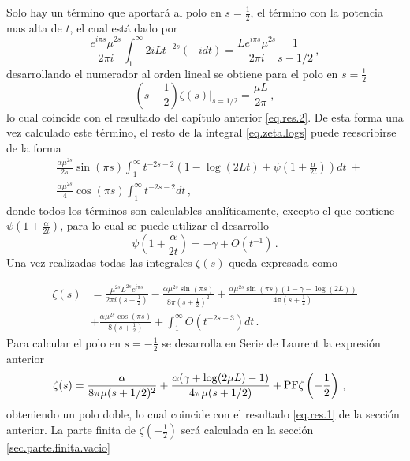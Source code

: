 Solo hay un término que aportará al polo en $s= \frac{1}{2}$, el término con la potencia mas alta de $t$, el cual está dado por
\begin{equation}
    \frac{e^{i \pi s} \mu ^{2s} }{2 \pi i }
    \int _1 ^{\infty}
    2 i L    
    t ^{-2 s}
    (-i dt) =  
    \frac{L e^{i \pi s} \mu ^{2s}}{2 \pi i} \frac{1}{s-1/2   }
    	\, ,
\end{equation}
desarrollando el numerador al orden lineal se obtiene para el polo en $s= \frac{1}{2}$ 
\begin{equation}
	\left(s- \frac{1}{2} \right)
    \zeta (s) \Big| _{s=1/2} = \frac{\mu L }{2 \pi} 
    	\, ,
\end{equation}
lo cual coincide con el resultado del capítulo anterior \eqref{eq.res.2}.
De esta forma una vez calculado este término, el resto de la integral \eqref{eq.zeta.logs} puede reescribirse de la forma
\begin{align}
    & \frac{\alpha \mu ^{2s} }{2 \pi} \sin(\pi s)
    \int _1 ^{\infty}
    t ^{-2 s-2} 
    \left(
    1 -  \log (2Lt) + \psi \left( 1 + \frac{\alpha}{2t} \right)
    \right) dt \ + 
    	\nonumber \\[5pt]
    &
    \frac{\alpha \mu ^{2s} }{4} 
    \cos (\pi s)
    \int _1 ^{\infty} t^{-2s-2} dt
    	\, ,
\end{align}
donde todos los términos son calculables analíticamente, excepto el que contiene $\psi \left( 1 + \frac{\alpha}{2t} \right)$, para lo cual se puede utilizar el desarrollo
\begin{equation}
    \psi \left(1 + \frac{\alpha}{2 t} \right) =
    - \gamma + O \left( t^{-1} \right)
    \, .
\end{equation}
Una vez realizadas todas las integrales $\zeta (s)$ queda expresada como  

\begin{align}
\nonumber
    \zeta  (s)  & = 
     \frac{\mu ^{2s} L ^{2 s} e ^{i \pi s}}{2 \pi i (s-\frac{1}{2})}  
    -\frac{\alpha \mu ^{2s} \sin(\pi s)}{8 \pi \left( s+\frac{1}{2} \right) ^2}  + 
    \frac{\alpha \mu ^{2s} \sin  (\pi s) (1 - \gamma -   \log (2 L))}{4 \pi (s+ \frac{1}{2} )} 
\\
\label{eq.laurent}
    & + \frac{\alpha \mu ^{2s} \cos(\pi s)}{8 (s+\frac{1}{2} )} +
    \int _1 ^{\infty} O \left( t ^{-2s-3} \right) dt
    	\, .
\end{align}
Para calcular el polo en $s=- \frac{1}{2}$ se desarrolla en Serie de Laurent la expresión anterior
\begin{align}
\label{eq.result.zeta.c}
    &\zeta  (s) =  \frac{\alpha}{8  \pi \mu (s+1/2)^2} +
    \frac{ \alpha ( \gamma  +  \log (2\mu L ) -1 ) }{4  \pi \mu (s+1/2) }  + 
	{\rm PF } \zeta \left( - \frac{1}{2} \right)
    	\, ,
\end{align}
obteniendo un polo doble, lo cual coincide con el resultado \eqref{eq.res.1} de la sección anterior.
La parte finita de $ \zeta \left( - \frac{1}{2} \right)$ será calculada en la sección \ref{sec.parte.finita.vacio}

